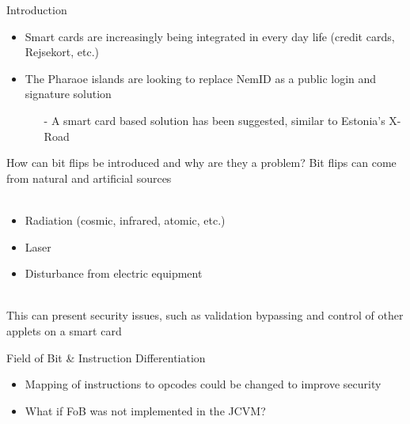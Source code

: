 


\begin{frame}[fragile]{Introduction}
\begin{center}
	\begin{itemize}
	\item Smart cards are increasingly being integrated in every day life (credit cards, Rejsekort, etc.)
	\item The Pharaoe islands are looking to replace NemID as a public login and signature solution
		\begin{itemize}
		\item[-] A smart card based solution has been suggested, similar to Estonia's X-Road 
		\end{itemize}
	\end{itemize}
\end{center}
\end{frame}

\begin{frame}[fragile]{\large How can bit flips be introduced and why are they a problem?}
Bit flips can come from natural and artificial sources\\~\\
	\begin{itemize}
	\item Radiation (cosmic, infrared, atomic, etc.)
	\item Laser
    \item Disturbance from electric equipment\\~\\
	\end{itemize}
This can present security issues, such as validation bypassing and control of other applets on a smart card
\end{frame}

\begin{frame}[fragile]{Field of Bit \& Instruction Differentiation}
\begin{itemize}
\item Mapping of instructions to opcodes could be changed to improve security
\item What if FoB was not implemented in the JCVM?
\end{itemize}
\end{frame}

